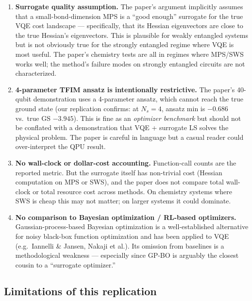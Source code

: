 \documentclass[11pt]{article}
\begin{document}
\begin{enumerate}
  \item \textbf{Surrogate quality assumption.} The paper's argument implicitly assumes
        that a small-bond-dimension MPS is a ``good enough'' surrogate for the true
        VQE cost landscape --- specifically, that its Hessian eigenvectors are close
        to the true Hessian's eigenvectors. This is plausible for weakly entangled
        systems but is not obviously true for the strongly entangled regime where VQE
        is most useful. The paper's chemistry tests are all in regimes where MPS/SWS
        works well; the method's failure modes on strongly entangled circuits are not
        characterized.
  \item \textbf{4-parameter TFIM ansatz is intentionally restrictive.} The paper's
        40-qubit demonstration uses a 4-parameter ansatz, which cannot reach the true
        ground state (our replication confirms: at $N_s{=}4$, ansatz min is $-0.686$
        vs.\ true GS $-3.945$). This is fine as an \emph{optimizer benchmark} but
        should not be conflated with a demonstration that VQE + surrogate LS solves
        the physical problem. The paper is careful in language but a casual reader
        could over-interpret the QPU result.
  \item \textbf{No wall-clock or dollar-cost accounting.} Function-call counts are the
        reported metric. But the surrogate itself has non-trivial cost (Hessian
        computation on MPS or SWS), and the paper does not compare total wall-clock
        or total resource cost across methods. On chemistry systems where SWS is
        cheap this may not matter; on larger systems it could dominate.
  \item \textbf{No comparison to Bayesian optimization / RL-based optimizers.}
        Gaussian-process-based Bayesian optimization is a well-established
        alternative for noisy black-box function optimization and has been applied to
        VQE (e.g.\ Iannelli \& Jansen, Nakaji et al.). Its omission from baselines is
        a methodological weakness --- especially since GP-BO is arguably the closest
        cousin to a ``surrogate optimizer.''
\end{enumerate}

\subsection{Limitations of this replication}
\end{document}
